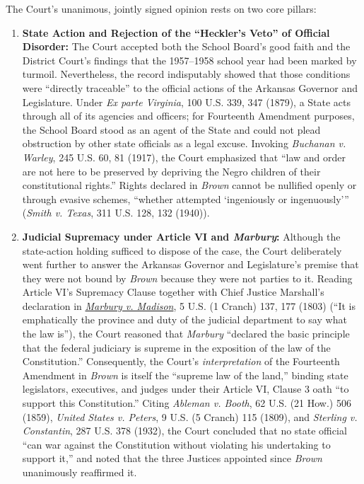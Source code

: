 \documentclass[12pt]{article}
\begin{document}
The Court's unanimous, jointly signed opinion rests on two core pillars:
\begin{enumerate}
  \item \textbf{State Action and Rejection of the ``Heckler's Veto'' of Official Disorder:} The Court accepted both the School Board's good faith and the District Court's findings that the 1957--1958 school year had been marked by turmoil. Nevertheless, the record indisputably showed that those conditions were ``directly traceable'' to the official actions of the Arkansas Governor and Legislature. Under \textit{Ex parte Virginia}, 100 U.S. 339, 347 (1879), a State acts through all of its agencies and officers; for Fourteenth Amendment purposes, the School Board stood as an agent of the State and could not plead obstruction by other state officials as a legal excuse. Invoking \textit{Buchanan v. Warley}, 245 U.S. 60, 81 (1917), the Court emphasized that ``law and order are not here to be preserved by depriving the Negro children of their constitutional rights.'' Rights declared in \textit{Brown} cannot be nullified openly or through evasive schemes, ``whether attempted `ingeniously or ingenuously''' (\textit{Smith v. Texas}, 311 U.S. 128, 132 (1940)).
  \item \textbf{Judicial Supremacy under Article VI and \textit{Marbury}:} Although the state-action holding sufficed to dispose of the case, the Court deliberately went further to answer the Arkansas Governor and Legislature's premise that they were not bound by \textit{Brown} because they were not parties to it. Reading Article VI's Supremacy Clause together with Chief Justice Marshall's declaration in \href{https://supreme.justia.com/cases/federal/us/5/137/}{\textit{Marbury v. Madison}}, 5 U.S. (1 Cranch) 137, 177 (1803) (``It is emphatically the province and duty of the judicial department to say what the law is''), the Court reasoned that \textit{Marbury} ``declared the basic principle that the federal judiciary is supreme in the exposition of the law of the Constitution.'' Consequently, the Court's \emph{interpretation} of the Fourteenth Amendment in \textit{Brown} is itself the ``supreme law of the land,'' binding state legislators, executives, and judges under their Article VI, Clause 3 oath ``to support this Constitution.'' Citing \textit{Ableman v. Booth}, 62 U.S. (21 How.) 506 (1859), \textit{United States v. Peters}, 9 U.S. (5 Cranch) 115 (1809), and \textit{Sterling v. Constantin}, 287 U.S. 378 (1932), the Court concluded that no state official ``can war against the Constitution without violating his undertaking to support it,'' and noted that the three Justices appointed since \textit{Brown} unanimously reaffirmed it.
\end{enumerate}
\end{document}
